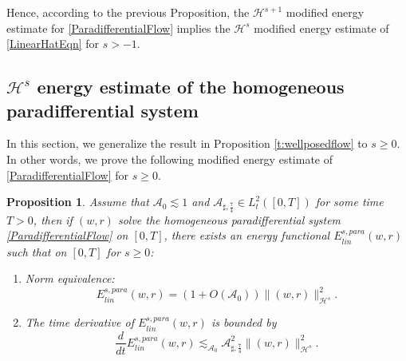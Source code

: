 \documentclass[10pt]{amsart}
\newtheorem{proposition}[theorem]{Proposition}
\theoremstyle{remark}
\theoremstyle{definition}
\numberwithin{equation}{section}
\renewcommand{\H}{{\mathcal H }}
\newcommand{\f}{\frac}
\newcommand{\CalAZ}{{\mathcal{A}_0}}
\newcommand{\ASSharp}{{\mathcal{A}_{\sharp,\frac{7}{4}}^2}}
\begin{document}
Hence, according to the previous Proposition, the $\H^{s+1}$ modified energy estimate for \eqref{ParadifferentialFlow} implies the $\H^s$ modified energy estimate of \eqref{LinearHatEqn} for $s> -1$.


\subsection{$\H^s$ energy estimate of the homogeneous paradifferential system} \label{s:HsHomogeneousSys}
In this section, we generalize the result in Proposition \ref{t:wellposedflow} to $s \geq 0$.
In other words, we prove the following modified energy estimate of \eqref{ParadifferentialFlow} for $s\geq 0$.
\begin{proposition} \label{t:Hswellposedflow}
Assume that $\mathcal{A}_0
\lesssim 1$ and $\mathcal{A}_{\sharp,\f74}  \in L^2_t([0,T])$ for some time $T>0$, then if $(w,r)$ solve the homogeneous paradifferential system \eqref{ParadifferentialFlow} on $[0,T]$, there exists an  energy functional $E^{s,para}_{lin}(w, r)$ such that on $[0,T]$ for $s\geq 0$:
\begin{enumerate}
\item Norm equivalence:
\begin{equation*}
    E^{s,para}_{lin}(w, r) = (1+O(\CalAZ)) \|(w,r)\|_{\H^s}^2.
\end{equation*}
\item The time derivative of $E^{s,para}_{lin}(w, r)$ is bounded by
\begin{equation*}
    \frac{d}{dt}  E^{s,para}_{lin}(w, r) \lesssim_{\CalAZ} \ASSharp \|(w,r)\|_{\H^s}^2.
\end{equation*}
\end{enumerate}  
\end{proposition}
\end{document}
